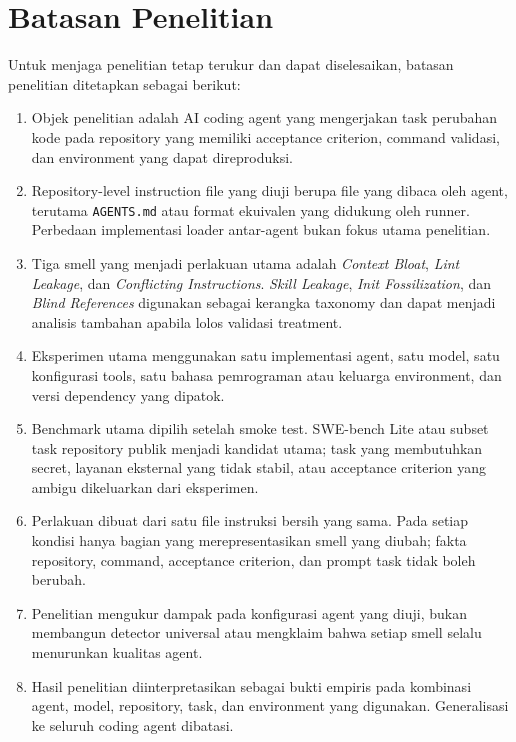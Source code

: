 \section{Batasan Penelitian}

Untuk menjaga penelitian tetap terukur dan dapat diselesaikan, batasan penelitian ditetapkan sebagai berikut:

\begin{enumerate}[leftmargin=*]
    \item Objek penelitian adalah AI coding agent yang mengerjakan task perubahan kode pada repository yang memiliki acceptance criterion, command validasi, dan environment yang dapat direproduksi.
    \item Repository-level instruction file yang diuji berupa file yang dibaca oleh agent, terutama \texttt{AGENTS.md} atau format ekuivalen yang didukung oleh runner. Perbedaan implementasi loader antar-agent bukan fokus utama penelitian.
    \item Tiga smell yang menjadi perlakuan utama adalah \textit{Context Bloat}, \textit{Lint Leakage}, dan \textit{Conflicting Instructions}. \textit{Skill Leakage}, \textit{Init Fossilization}, dan \textit{Blind References} digunakan sebagai kerangka taxonomy dan dapat menjadi analisis tambahan apabila lolos validasi treatment.
    \item Eksperimen utama menggunakan satu implementasi agent, satu model, satu konfigurasi tools, satu bahasa pemrograman atau keluarga environment, dan versi dependency yang dipatok.
    \item Benchmark utama dipilih setelah smoke test. SWE-bench Lite atau subset task repository publik menjadi kandidat utama; task yang membutuhkan secret, layanan eksternal yang tidak stabil, atau acceptance criterion yang ambigu dikeluarkan dari eksperimen.
    \item Perlakuan dibuat dari satu file instruksi bersih yang sama. Pada setiap kondisi hanya bagian yang merepresentasikan smell yang diubah; fakta repository, command, acceptance criterion, dan prompt task tidak boleh berubah.
    \item Penelitian mengukur dampak pada konfigurasi agent yang diuji, bukan membangun detector universal atau mengklaim bahwa setiap smell selalu menurunkan kualitas agent.
    \item Hasil penelitian diinterpretasikan sebagai bukti empiris pada kombinasi agent, model, repository, task, dan environment yang digunakan. Generalisasi ke seluruh coding agent dibatasi.
\end{enumerate}

